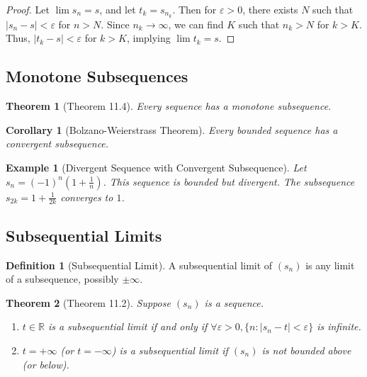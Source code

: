 \documentclass[9pt]{article}
\theoremstyle{definition}
\newtheorem{definition}{Definition}
\theoremstyle{plain}
\newtheorem{theorem}{Theorem}
\newtheorem{example}{Example}
\newtheorem{corollary}{Corollary}
\begin{document}
\begin{proof}
Let \( \lim s_n = s \), and let \( t_k = s_{n_k} \). Then for \( \varepsilon > 0 \), there exists \( N \) such that \( |s_n - s| < \varepsilon \) for \( n > N \). Since \( n_k \to \infty \), we can find \( K \) such that \( n_k > N \) for \( k > K \). Thus, \( |t_k - s| < \varepsilon \) for \( k > K \), implying \( \lim t_k = s \).
\end{proof}

\subsection*{Monotone Subsequences}
\begin{theorem}[Theorem 11.4]
Every sequence has a monotone subsequence.
\end{theorem}

\begin{corollary}[Bolzano-Weierstrass Theorem]
Every bounded sequence has a convergent subsequence.
\end{corollary}

\begin{example}[Divergent Sequence with Convergent Subsequence]
Let \( s_n = (-1)^n \left(1 + \frac{1}{n}\right) \). This sequence is bounded but divergent. The subsequence \( s_{2k} = 1 + \frac{1}{2k} \) converges to \( 1 \).
\end{example}

\subsection*{Subsequential Limits}
\begin{definition}[Subsequential Limit]
A subsequential limit of \( (s_n) \) is any limit of a subsequence, possibly \( \pm\infty \).
\end{definition}

\begin{theorem}[Theorem 11.2]
Suppose \( (s_n) \) is a sequence.
\begin{enumerate}
    \item \( t \in \mathbb{R} \) is a subsequential limit if and only if \( \forall \varepsilon > 0, \{n : |s_n - t| < \varepsilon\} \) is infinite.
    \item \( t = +\infty \) (or \( t = -\infty \)) is a subsequential limit if \( (s_n) \) is not bounded above (or below).
\end{enumerate}
\end{theorem}
\end{document}

